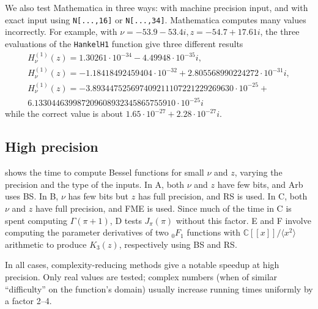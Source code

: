 \documentclass[11pt]{article}
\begin{document}
We also test Mathematica in three ways: with machine precision input,
and with exact input using \texttt{N[...,16]} or \texttt{N[...,34]}.
Mathematica computes many values incorrectly. For example,
with $\nu=-53.9-53.4i, z = -54.7+17.61i$, the three evaluations
of the \texttt{HankelH1} function give three different results
\begin{equation*}
\begin{array}{c}
H^{(1)}_{\nu}(z) = 1.30261 \cdot 10^{-34} - 4.49948 \cdot 10^{-35} i, \\
H^{(1)}_{\nu}(z) = -1.18418492459404 \cdot 10^{-32} + 2.805568990224272 \cdot 10^{-31} i, \\
H^{(1)}_{\nu}(z) = -3.893447525697409211107221229269630 \cdot 10^{-25} + \\
6.133044639987209608932345865755910 \cdot 10^{-25} i
\end{array}
\end{equation*}
while the correct value is about $1.65 \cdot 10^{-27} + 2.28 \cdot 10^{-27} i$.

\subsection{High precision}

 shows the time to compute Bessel functions
for small $\nu$ and $z$,
varying the precision and the type of the inputs.
In A, both $\nu$ and $z$ have few bits, and Arb uses BS.
In B, $\nu$ has few bits but $z$ has full precision, and RS is used.
In C, both $\nu$ and $z$ have full precision, and FME is used.
Since much of the time in C is spent computing $\Gamma(\pi+1)$,
D tests $J_{\pi}(\pi)$ without this factor.
E and F involve computing the parameter derivatives
of two ${}_0F_1$ functions with $\mathbb{C}[[x]] / \langle x^2 \rangle$
arithmetic to produce $K_3(z)$, respectively using BS and RS.

In all cases, complexity-reducing methods give a notable speedup at high precision.
Only real values are tested; complex numbers (when of similar
``difficulty'' on the function's domain)
usually increase running times uniformly by a factor 2--4.
\end{document}
